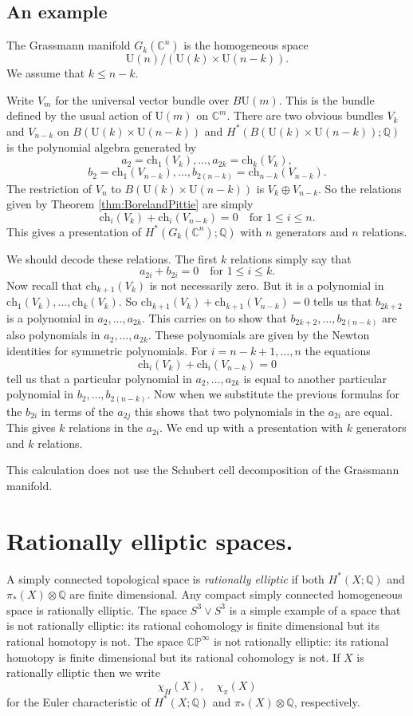 \documentclass[twoside,a4paper,reqno,11pt]{amsart}
\newcommand{\C}{\mathbb{C}}
\renewcommand{\P}{\mathbb{P}}
\newcommand{\Q}{\mathbb{Q}}
\newcommand{\CP}{\C\P}
\renewcommand{\o}{\otimes}
\newcommand{\U}{\mathrm{U}}
\newcommand{\ch}{\mathrm{ch}}
\begin{document}
\subsection{An example}
The Grassmann manifold $G_k(\C^n)$ is the homogeneous space
$$
\U(n)/(\U(k) \times \U(n-k)).
$$
We assume that $k \leq n-k$. 

Write $V_m$ for the universal vector bundle over $B\U(m)$.  This is the bundle defined by the usual action of $\U(m)$ on $\C^m$. There are two obvious bundles $V_k$ and $V_{n-k}$ on $B(\U(k) \times \U(n-k))$ and $H^*(B(\U(k) \times \U(n-k)); \Q)$ is the polynomial algebra generated by
$$
a_2 = \ch_1(V_k), \dots, a_{2k} = \ch_k(V_k),
$$$$
b_2 = \ch_1(V_{n-k}), \dots, b_{2(n-k)} = \ch_{n-k}(V_{n-k}).
$$
The restriction of $V_n$ to $B(\U(k) \times \U(n-k))$ is $V_k \oplus V_{n-k}$.  So the relations given by Theorem \ref{thm:BorelandPittie}
are simply
$$
\ch_i(V_k) + \ch_i(V_{n-k}) = 0 \quad \text{for $1 \leq i \leq n$.}
$$
This gives a presentation of $H^*(G_k(\C^n); \Q)$ with $n$ generators and $n$ relations.

We should decode these relations.   The first $k$ relations simply say that
$$
a_{2i} + b_{2i} = 0 \quad \text{for $1 \leq i \leq k$.}
$$
Now recall that $\ch_{k+1}(V_k)$ is not necessarily zero.  But it is a polynomial in $\ch_1(V_k), \dots , \ch_{k}(V_k)$. So $\ch_{k+1}(V_k) + \ch_{k+1}(V_{n-k}) = 0$ tells us that $b_{2k+2}$ is a polynomial in $a_2, \dots , a_{2k}$.  This carries on to show that $b_{2k+2}, \dots , b_{2(n-k)}$ are also polynomials in $a_2, \dots, a_{2k}$.  These polynomials are given by the Newton identities for symmetric polynomials.  For $i = n-k+1, \dots, n$ the equations
$$
\ch_i(V_k) + \ch_i(V_{n-k}) = 0
$$
tell us that a particular polynomial in $a_2, \dots, a_{2k}$ is equal to another particular polynomial in $b_2, \dots, b_{2(n-k)}$.  Now when we substitute the previous formulas for the $b_{2i}$ in terms of the $a_{2j}$ this shows that two polynomials in the $a_{2i}$ are equal.  This gives $k$ relations in the $a_{2i}$. We end up with a presentation with $k$ generators and $k$ relations.  

This calculation does not use the Schubert cell decomposition of the Grassmann manifold.

\section{Rationally elliptic spaces.} \label{sec:ratelliptic}
A simply connected topological space is {\em rationally elliptic} if both $H^*(X;\Q)$ and $\pi_*(X) \o \Q$ are finite dimensional. Any compact simply connected homogeneous space is rationally elliptic.  The space $S^3 \vee S^3$ is a simple example of a space that is not rationally elliptic: its rational cohomology is finite dimensional but its rational homotopy is not.  The space $\CP^{\infty}$ is not rationally elliptic: its rational homotopy is finite dimensional but its rational cohomology is not.   If $X$ is rationally elliptic then we write
$$
\chi_H(X), \quad \chi_{\pi}(X)
$$
for the Euler characteristic of $H^*(X;\Q)$ and $\pi_*(X) \o \Q$, respectively.
\end{document}
